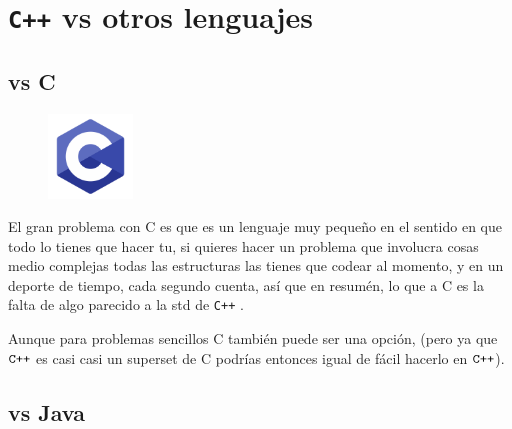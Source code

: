 \documentclass[12pt, fleqn]{report}                             %
\newcommand \Quote              {\qq}                           %
\theoremstyle{break}                                            %
\newcommand{\textCode}[1]  { \texttt{#1} }                      %
\newcommand{\Cpp}{\ignorespaces\textCode{C++}}                  %
\begin{document}
        \clearpage
        \section{\Cpp vs otros lenguajes}

            \subsection{vs C}

                \begin{figure}
                    \centering
                    \includegraphics[width=0.20\textwidth]{C}
                \end{figure}

                El gran problema con C es que es un lenguaje muy pequeño en el sentido en que todo lo tienes que hacer tu,
                si quieres hacer un problema que involucra cosas medio complejas todas las estructuras las tienes que codear
                al momento, y en un deporte de tiempo, cada segundo cuenta, así que en resumén, lo que \Quote{mata} a C es la falta
                de algo parecido a la std de \Cpp.

                Aunque para problemas sencillos C también puede ser una opción, (pero ya que $\Cpp$ es casi casi
                un superset de C podrías entonces igual de fácil hacerlo en $\Cpp$).

            \subsection{vs Java}
\end{document}
